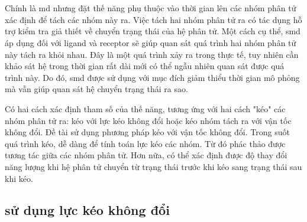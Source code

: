 \documentclass[12pt,a4paper,reqno, oneside]{book}
\begin{document}
\section{}
Chính là \gls{md} nhưng đặt thế năng phụ thuộc vào thời gian lên các nhóm phân tử xác định để tách các nhóm này ra. Việc tách hai nhóm phân tử ra có tác dụng hỗ trợ kiểm tra giả thiết về chuyển trạng thái của hệ phân tử. Một cách cụ thể, \gls{smd} áp dụng đối với \gls{ligand} và \gls{receptor} sẽ giúp quan sát quá trình hai nhóm phân tử này tách ra khỏi nhau. Đây là một quá trình xảy ra trong thực tế, tuy nhiên cần khảo sát hệ trong thời gian rất dài mới có thể ngẫu nhiên quan sát được quá trình này. Do đó, \gls{smd} được sử dụng với mục đích giảm thiểu thời gian mô phỏng mà vẫn giúp quan sát hệ chuyển trạng thái ra sao.

Có hai cách xác định tham số của thế năng, tương ứng với hai cách "kéo" các nhóm phân tử ra: kéo với lực kéo không đổi hoặc kéo nhóm tách ra với vận tốc không đổi. Đề tài sử dụng phương pháp kéo với vận tốc không đổi\cite{Lu1998}. Trong suốt quá trình kéo, dễ dàng để tính toán lực kéo các nhóm. Từ đó phác thảo được tương tác giữa các nhóm phân tử. Hơn nữa, có thể xác định được độ thay đổi năng lượng khi hệ phân tử chuyển từ trạng thái trước khi kéo sang trạng thái sau khi kéo.


	\subsection{ sử dụng lực kéo không đổi}
	
\end{document}
